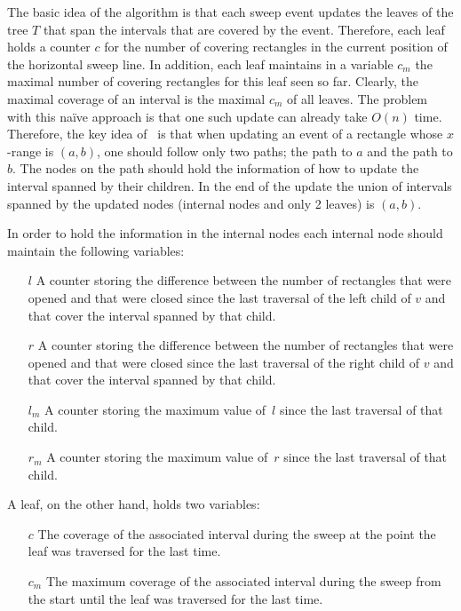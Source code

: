 {{The basic idea of the algorithm is that
each sweep event updates the leaves of the tree $T$
that span the intervals that are covered by the event.
Therefore, each leaf holds a counter $c$ for the
number of covering rectangles in the current position
of the horizontal sweep line.
In addition, each leaf maintains in
a variable $c_m$ the maximal number of
covering rectangles for this leaf seen so far.
Clearly, the maximal coverage of an interval
is the maximal $c_m$ of all leaves.
The problem with this na\"{i}ve approach
is that one such update can already
take $O(n)$ time.
Therefore, the key idea of~\cite{as-cdaaa-13}
is that when updating an event of a rectangle
whose $x$-range is $(a,b)$,
one should follow only two paths;
the path to $a$ and the path to $b$.
The nodes on the path should hold the
information of how to update the
interval spanned by their children.
In the end of the update the union of
intervals spanned by the updated nodes
(internal nodes and only 2 leaves) is $(a,b)$.

In order to hold the information in the internal nodes
each internal node should maintain the following variables:
\begin{itemize}
\item[$l$]
A counter storing the difference between the number of
rectangles that were opened and that were closed
since the last traversal of the left child of $v$
and that cover the interval spanned by that child.
\item[$r$]
A counter storing the difference between the number of
rectangles that were opened and that were closed
since the last traversal of the right child of $v$
and that cover the interval spanned by that child.
\item[$l_m$]
A counter storing the maximum value of~$l$
since the last traversal of that child.
\item[$r_m$]
A counter storing the maximum value of~$r$
since the last traversal of that child.
\end{itemize}

\noindent
A leaf, on the other hand, holds two variables:
\begin{itemize}
\item[$c$]
The coverage of the associated interval during the sweep
at the point the leaf was traversed for the last time. \item[$c_m$]
The maximum coverage of the associated
interval during the sweep from the start until the leaf was traversed for the last time. \end{itemize}

}}
